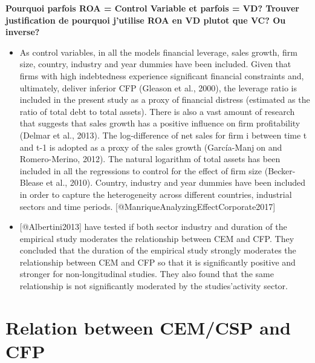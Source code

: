 \documentclass[]{article}
\begin{document}
\textbf{Pourquoi parfois ROA = Control Variable et parfois = VD? Trouver
justification de pourquoi j'utilise ROA en VD plutot que VC? Ou
inverse?}

\begin{itemize}
\item
  As control variables, in all the models financial leverage, sales
  growth, firm size, country, industry and year dummies have been
  included. Given that firms with high indebtedness experience
  significant financial constraints and, ultimately, deliver inferior
  CFP (Gleason et al., 2000), the leverage ratio is included in the
  present study as a proxy of financial distress (estimated as the ratio
  of total debt to total assets). There is also a vast amount of
  research that suggests that sales growth has a positive influence on
  firm profitability (Delmar et al., 2013). The log-difference of net
  sales for firm i between time t and t-1 is adopted as a proxy of the
  sales growth (García-Manjon and Romero-Merino, 2012). The natural
  logarithm of total assets has been included in all the regressions to
  control for the effect of firm size (Becker-Blease et al., 2010).
  Country, industry and year dummies have been included in order to
  capture the heterogeneity across different countries, industrial
  sectors and time periods. {[}@ManriqueAnalyzingEffectCorporate2017{]}
\item
  {[}@Albertini2013{]} have tested if both sector industry and duration
  of the empirical study moderates the relationship between CEM and CFP.
  They concluded that the duration of the empirical study strongly
  moderates the relationship between CEM and CFP so that it is
  significantly positive and stronger for non-longitudinal studies. They
  also found that the same relationship is not significantly moderated
  by the studies'activity sector.
\end{itemize}

\section{Relation between CEM/CSP and
CFP}\label{relation-between-cemcsp-and-cfp}
\end{document}
